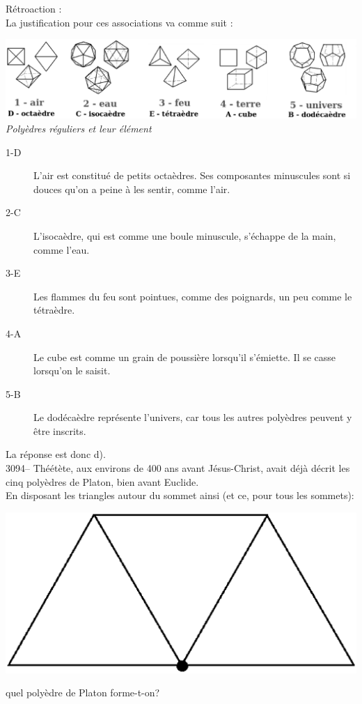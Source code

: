 \documentclass[letterpaper, 12pt]{article}
\begin{document}
R\'etroaction :\\
La justification pour ces associations va comme suit :
\begin{center}
\includegraphics[scale=0.5]{Polyedres_et_elements.eps}\\
\emph{Poly\`edres r\'eguliers et leur \'el\'ement}
\end{center}
\begin{description}
\item[1-D] L'air est constitu\'e de petits octa\`edres. Ses composantes minuscules sont si douces qu'on a peine \`a les sentir, comme l'air.\\
\item[2-C] L'isoca\`edre, qui est comme une boule minuscule, s'\'echappe de la main, comme l'eau.\\
\item[3-E] Les flammes du feu sont pointues, comme des poignards, un peu comme le t\'etra\`edre.\\
\item[4-A] Le cube est comme un grain de poussi\`ere lorsqu'il s'\'emiette. Il se casse lorsqu'on le saisit.\\
\item[5-B] Le dod\'eca\`edre repr\'esente l'univers, car tous les autres poly\`edres peuvent y \^etre inscrits.\\
\end{description}
La r\'eponse est donc d).\\



3094-- Th\'e\'et\`ete, aux environs de 400 ans avant J\'esus-Christ, avait d\'ej\`a d\'ecrit les cinq poly\`edres de Platon, bien avant Euclide.\\
En disposant les triangles autour du sommet ainsi (et ce, pour tous les sommets):
\begin{center}
\includegraphics[scale=0.1, angle=135]{sommetpoly.eps}\\
\end{center}
quel poly\`edre de Platon forme-t-on?\\
\end{document}
